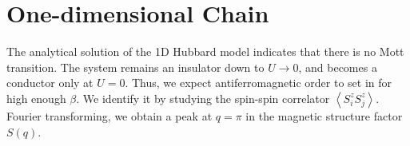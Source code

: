 \section{One-dimensional Chain}
\label{sec:1d-chain}

The analytical solution of the \acs{1D} Hubbard model indicates that there is no Mott transition.
The system remains an insulator down to $U \rightarrow 0$, and becomes a conductor only at $U = 0$.
Thus, we expect antiferromagnetic order to set in for high enough $\beta$.
We identify it by studying the spin-spin correlator $\left\langle S^z_i S^z_j \right\rangle$.
Fourier transforming, we obtain a peak at $q = \pi$ in the magnetic structure factor $S ( q ) $.